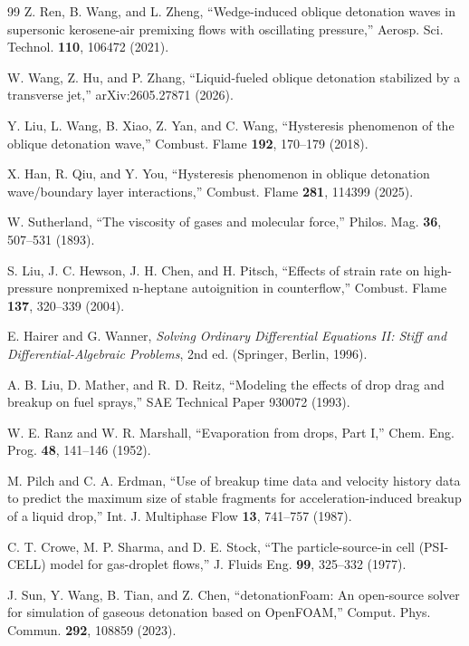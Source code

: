 \documentclass[aip,pof,preprint,amsmath,amssymb]{revtex4-2}
\begin{document}
\begin{thebibliography}{99}
 Z. Ren, B. Wang, and L. Zheng, ``Wedge-induced oblique detonation waves in supersonic kerosene-air premixing flows with oscillating pressure,'' Aerosp. Sci. Technol. \textbf{110}, 106472 (2021).

 W. Wang, Z. Hu, and P. Zhang, ``Liquid-fueled oblique detonation stabilized by a transverse jet,'' arXiv:2605.27871 (2026).

 Y. Liu, L. Wang, B. Xiao, Z. Yan, and C. Wang, ``Hysteresis phenomenon of the oblique detonation wave,'' Combust. Flame \textbf{192}, 170--179 (2018).

 X. Han, R. Qiu, and Y. You, ``Hysteresis phenomenon in oblique detonation wave/boundary layer interactions,'' Combust. Flame \textbf{281}, 114399 (2025).

 W. Sutherland, ``The viscosity of gases and molecular force,'' Philos. Mag. \textbf{36}, 507--531 (1893).

 S. Liu, J. C. Hewson, J. H. Chen, and H. Pitsch, ``Effects of strain rate on high-pressure nonpremixed n-heptane autoignition in counterflow,'' Combust. Flame \textbf{137}, 320--339 (2004).

 E. Hairer and G. Wanner, \textit{Solving Ordinary Differential Equations II: Stiff and Differential-Algebraic Problems}, 2nd ed. (Springer, Berlin, 1996).

 A. B. Liu, D. Mather, and R. D. Reitz, ``Modeling the effects of drop drag and breakup on fuel sprays,'' SAE Technical Paper 930072 (1993).

 W. E. Ranz and W. R. Marshall, ``Evaporation from drops, Part I,'' Chem. Eng. Prog. \textbf{48}, 141--146 (1952).

 M. Pilch and C. A. Erdman, ``Use of breakup time data and velocity history data to predict the maximum size of stable fragments for acceleration-induced breakup of a liquid drop,'' Int. J. Multiphase Flow \textbf{13}, 741--757 (1987).

 C. T. Crowe, M. P. Sharma, and D. E. Stock, ``The particle-source-in cell (PSI-CELL) model for gas-droplet flows,'' J. Fluids Eng. \textbf{99}, 325--332 (1977).

 J. Sun, Y. Wang, B. Tian, and Z. Chen, ``detonationFoam: An open-source solver for simulation of gaseous detonation based on OpenFOAM,'' Comput. Phys. Commun. \textbf{292}, 108859 (2023).


\end{thebibliography}
\end{document}
